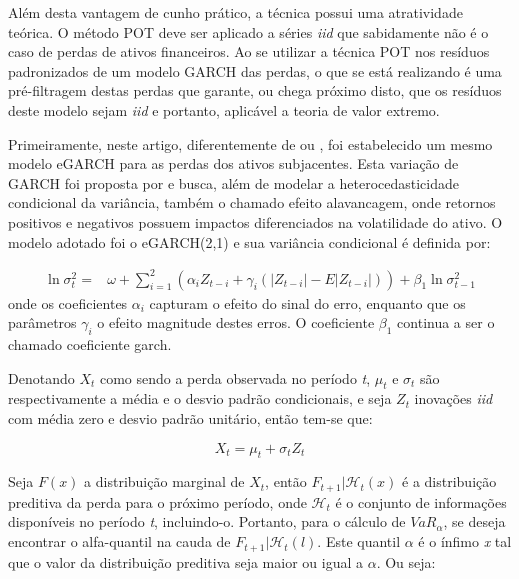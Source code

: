 \documentclass[1p]{elsarticle}
\theoremstyle{definition}
\begin{document}
Além desta vantagem de cunho prático, a técnica possui uma atratividade teórica. O método POT deve ser aplicado a séries \emph{iid} que sabidamente não é o caso de perdas de ativos financeiros. Ao se utilizar a técnica POT nos resíduos padronizados de um modelo GARCH das perdas, o que se está realizando é uma pré-filtragem destas perdas que garante, ou chega próximo disto, que os resíduos deste modelo sejam \emph{iid} e portanto, aplicável a teoria de valor extremo. 

Primeiramente, neste artigo, diferentemente de \cite{McNeil2000} ou \cite{Karmakar2014}, foi estabelecido um mesmo modelo eGARCH para as perdas dos ativos subjacentes. Esta variação de GARCH foi proposta por \cite{Nelson1991} e busca, além de modelar a heterocedasticidade condicional da variância, também o chamado efeito alavancagem, onde retornos positivos e negativos possuem impactos diferenciados na volatilidade do ativo. O modelo adotado foi o eGARCH(2,1) e sua variância condicional é definida por:

\begin{align}
\label{eq:egarch}
\ln\sigma_t^2=&\omega+ \sum_{i=1}^{2}\left(\alpha_i Z_{t-i}+ \gamma_i(|Z_{t-i}|-E|Z_{t-i}|)\right)+ \beta_1 \ln\sigma_{t-1}^2
\end{align}
onde os coeficientes $\alpha_i$ capturam o efeito do sinal do erro, enquanto que os parâmetros $\gamma_i$ o efeito magnitude destes erros. O coeficiente $\beta_1$ continua a ser o chamado coeficiente garch. %


Denotando $X_t$ como sendo a perda observada no período \emph{t}, $\mu_t$ e $\sigma_t$ são respectivamente a média e o desvio padrão condicionais, e seja $Z_t$ inovações \emph{iid} com média zero e desvio padrão unitário, então tem-se que:

\begin{equation}
\label{eq:loss}
X_t=\mu_t+\sigma_t Z_t
\end{equation}

Seja $F(x)$ a distribuição marginal de $X_t$, então $F_{t+1} | \mathcal{H}_t(x)$ é a distribuição preditiva da perda para o próximo período, onde $\mathcal{H}_t$ é o conjunto de informações disponíveis no período \emph{t}, incluindo-o. Portanto, para o cálculo de $VaR_\alpha$, se deseja encontrar o alfa-quantil na cauda de $F_{t+1} | \mathcal{H}_t(l)$. Este quantil $\alpha$ é o ínfimo \emph{x} tal que o valor da distribuição preditiva seja maior ou igual a $\alpha$. Ou seja:
\end{document}
